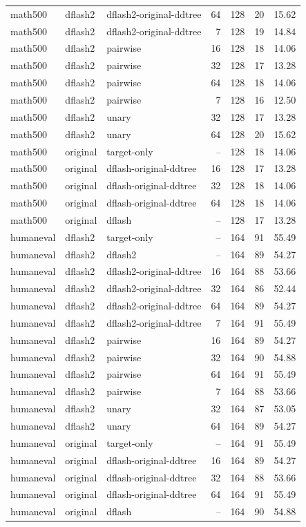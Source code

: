 \begin{longtable}{lllrrrr}
math500 & dflash2 & dflash2-original-ddtree & 64 & 128 & 20 & 15.62 \\
math500 & dflash2 & dflash2-original-ddtree & 7 & 128 & 19 & 14.84 \\
math500 & dflash2 & pairwise & 16 & 128 & 18 & 14.06 \\
math500 & dflash2 & pairwise & 32 & 128 & 17 & 13.28 \\
math500 & dflash2 & pairwise & 64 & 128 & 18 & 14.06 \\
math500 & dflash2 & pairwise & 7 & 128 & 16 & 12.50 \\
math500 & dflash2 & unary & 32 & 128 & 17 & 13.28 \\
math500 & dflash2 & unary & 64 & 128 & 20 & 15.62 \\
math500 & original & target-only & -- & 128 & 18 & 14.06 \\
math500 & original & dflash-original-ddtree & 16 & 128 & 17 & 13.28 \\
math500 & original & dflash-original-ddtree & 32 & 128 & 18 & 14.06 \\
math500 & original & dflash-original-ddtree & 64 & 128 & 18 & 14.06 \\
math500 & original & dflash & -- & 128 & 17 & 13.28 \\
humaneval & dflash2 & target-only & -- & 164 & 91 & 55.49 \\
humaneval & dflash2 & dflash2 & -- & 164 & 89 & 54.27 \\
humaneval & dflash2 & dflash2-original-ddtree & 16 & 164 & 88 & 53.66 \\
humaneval & dflash2 & dflash2-original-ddtree & 32 & 164 & 86 & 52.44 \\
humaneval & dflash2 & dflash2-original-ddtree & 64 & 164 & 89 & 54.27 \\
humaneval & dflash2 & dflash2-original-ddtree & 7 & 164 & 91 & 55.49 \\
humaneval & dflash2 & pairwise & 16 & 164 & 89 & 54.27 \\
humaneval & dflash2 & pairwise & 32 & 164 & 90 & 54.88 \\
humaneval & dflash2 & pairwise & 64 & 164 & 91 & 55.49 \\
humaneval & dflash2 & pairwise & 7 & 164 & 88 & 53.66 \\
humaneval & dflash2 & unary & 32 & 164 & 87 & 53.05 \\
humaneval & dflash2 & unary & 64 & 164 & 89 & 54.27 \\
humaneval & original & target-only & -- & 164 & 91 & 55.49 \\
humaneval & original & dflash-original-ddtree & 16 & 164 & 89 & 54.27 \\
humaneval & original & dflash-original-ddtree & 32 & 164 & 88 & 53.66 \\
humaneval & original & dflash-original-ddtree & 64 & 164 & 91 & 55.49 \\
humaneval & original & dflash & -- & 164 & 90 & 54.88 \\
\end{longtable}
